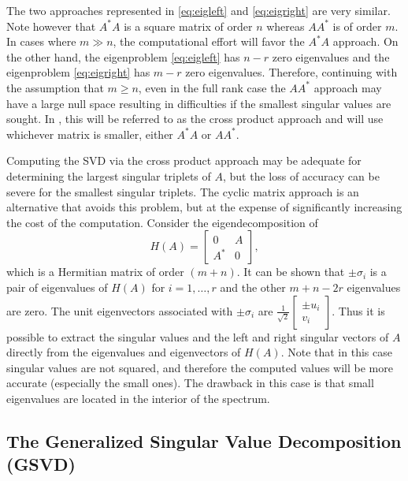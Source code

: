 The two approaches represented in \eqref{eq:eigleft} and \eqref{eq:eigright} are very similar. Note however that $A^*A$ is a square matrix of order $n$ whereas $AA^*$ is of order $m$. In cases where $m\gg n$, the computational effort will favor the $A^*A$ approach. On the other hand, the eigenproblem \eqref{eq:eigleft} has $n-r$ zero eigenvalues and the eigenproblem \eqref{eq:eigright} has $m-r$ zero eigenvalues. Therefore, continuing with the assumption that $m\geq n$, even in the full rank case the $AA^*$ approach may have a large null space resulting in difficulties if the smallest singular values are sought. In \slepc, this will be referred to as the cross product approach and will use whichever matrix is smaller, either $A^*A$ or $AA^*$.

Computing the SVD via the cross product approach may be adequate for determining the largest singular triplets of $A$, but the loss of accuracy can be severe for the smallest singular triplets. The cyclic matrix approach is an alternative that avoids this problem, but at the expense of significantly increasing the cost of the computation. Consider the eigendecomposition of
\begin{equation}
\label{eq:cyclic}
H(A)=\begin{bmatrix}0&A\\A^*&0\end{bmatrix},
\end{equation}
which is a Hermitian matrix of order $(m+n)$. It can be shown that $\pm\sigma_i$ is a pair of eigenvalues of $H(A)$ for $i=1,\ldots,r$ and the other $m+n-2r$ eigenvalues are zero. The unit eigenvectors associated with $\pm\sigma_i$ are $\frac{1}{\sqrt{2}}\left[\begin{smallmatrix}\pm u_i\\v_i\end{smallmatrix}\right]$. Thus it is possible to extract the singular values and the left and right singular vectors of $A$ directly from the eigenvalues and eigenvectors of $H(A)$. Note that in this case singular values are not squared, and therefore the computed values will be more accurate (especially the small ones). The drawback in this case is that small eigenvalues are located in the interior of the spectrum.

\subsection{\label{sec:gsvd}The Generalized Singular Value Decomposition (GSVD)}

